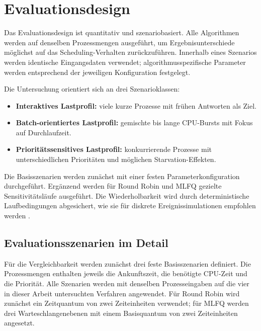 \section{Evaluationsdesign}

Das Evaluationsdesign ist quantitativ und szenariobasiert. Alle Algorithmen werden auf denselben Prozessmengen ausgeführt, um Ergebnisunterschiede möglichst auf das Scheduling-Verhalten zurückzuführen. Innerhalb eines Szenarios werden identische Eingangsdaten verwendet; algorithmusspezifische Parameter werden entsprechend der jeweiligen Konfiguration festgelegt.

Die Untersuchung orientiert sich an drei Szenarioklassen:

\begin{itemize}
    \item \textbf{Interaktives Lastprofil:} viele kurze Prozesse mit frühen Antworten als Ziel.
    \item \textbf{Batch-orientiertes Lastprofil:} gemischte bis lange CPU-Bursts mit Fokus auf Durchlaufzeit.
    \item \textbf{Prioritätssensitives Lastprofil:} konkurrierende Prozesse mit unterschiedlichen Prioritäten und möglichen Starvation-Effekten.
\end{itemize}

Die Basisszenarien werden zunächst mit einer festen Parameterkonfiguration durchgeführt. Ergänzend werden für Round Robin und MLFQ gezielte Sensitivitätsläufe ausgeführt. Die Wiederholbarkeit wird durch deterministische Laufbedingungen abgesichert, wie sie für diskrete Ereignissimulationen empfohlen werden \cite{banks2010discrete}.

\subsection{Evaluationsszenarien im Detail}

Für die Vergleichbarkeit werden zunächst drei feste Basisszenarien definiert. Die Prozessmengen enthalten jeweils die Ankunftszeit, die benötigte CPU-Zeit und die Priorität. Alle Szenarien werden mit denselben Prozesseingaben auf die vier in dieser Arbeit untersuchten Verfahren angewendet. Für Round Robin wird zunächst ein Zeitquantum von zwei Zeiteinheiten verwendet; für MLFQ werden drei Warteschlangenebenen mit einem Basisquantum von zwei Zeiteinheiten angesetzt.

